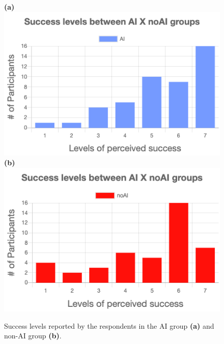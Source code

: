 \documentclass[letterpaper]{article} %
\begin{document}
\begin{figure}[!b]
\centering \textbf{(a)}
\includegraphics[width=.99 \columnwidth]{successAI.png}
\centering\textbf{ (b)}
\includegraphics[width=.99 \columnwidth]{successNoAi.png}
\caption{Success levels reported by the respondents in the AI group \textbf{(a)} and non-AI group \textbf{(b)}.}
\label{fig:success_graph}
\end{figure}
\end{document}

